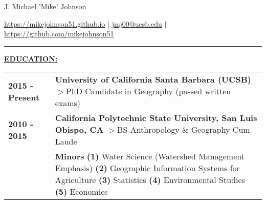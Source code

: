 \documentclass{article}
\newcommand\tab[1][1cm]{\hspace*{#1}} %
\newcommand{\header}[1]{\hspace{-5mm}\textcolor{header_blue}{\underline{\textbf{#1}}\\}} %
\begin{document}



\sffamily
\centerline{{\Huge \textcolor[RGB]{6,60,97}{J. Michael 'Mike' Johnson}}}
\vspace{3mm}
\centerline{\textcolor{header_blue}{\textcolor{gray}{\faGlobe} \hspace{0.2mm} \url{ https://mikejohnson51.github.io}} $|$ \textcolor{gray}{\faEnvelope} \hspace{0.2mm} \href{mailto:jmj00@ucsb.edu }{jmj00@ucsb.edu} $|$ \textcolor{header_blue}{\textcolor{gray}{\faGithub} \hspace{0.2mm} \url{ https://github.com/mikejohnson51}}}
\vspace{1mm}
\hspace{-.5cm}\textcolor[RGB]{6,60,97}{\rule{17cm}{3pt}}
\vspace{3mm}
\rmfamily

\header{EDUCATION:}
\newline
\hspace*{0mm}
\begin{tabular}{p{2.5cm}P{13.5cm}}
\textbf{2015 - Present} & \textbf{University of California Santa Barbara (UCSB)} \newline \tab $>$PhD Candidate in Geography (passed written exams) \\
\textbf{2010 - 2015} & \textbf{California Polytechnic State University, San Luis Obispo, CA} \newline \tab $>$BS Anthropology \& Geography Cum Laude \\
\ & \textbf{Minors} \textbf{(1)} Water Science (Watershed Management Emphasis) \textbf{(2)} Geographic \tab Information Systems for Agriculture \textbf{(3)} Statistics \textbf{(4)} Environmental Studies \tab \textbf{(5)} Economics
\end{tabular}
\vspace{5mm}

\end{document}

